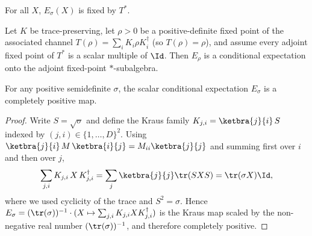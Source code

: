 \begin{lemma}
    \label{lem:scalar_conditional_expectation_mem_adjointFixedPoints}
    \leanok
    For all $X$, $E_\sigma(X)$ is fixed by $T^*$.
\end{lemma}

\begin{theorem}
    \label{thm:scalar_conditional_expectation_isConditionalExpectation}
    \leanok
    Let $K$ be trace-preserving, let $\rho>0$ be a positive-definite fixed
    point of the associated channel $T(\rho)=\sum_i K_i\rho K_i^\dagger$ (so $T(\rho)=\rho$), and
    assume every adjoint fixed point of $T^*$ is a scalar multiple of $\Id$.
    Then $E_\rho$ is a conditional expectation onto the adjoint fixed-point
    $*$-subalgebra.
\end{theorem}

\begin{lemma}
    \label{thm:scalar_conditional_expectation_isCPMap}
    \leanok
    For any positive semidefinite $\sigma$, the scalar conditional
    expectation $E_\sigma$ is a completely positive map.
\end{lemma}
\begin{proof}\leanok
    Write $S=\sqrt{\sigma}$ and define the Kraus family
    $K_{j,i}=\ketbra{j}{i}\,S$ indexed by $(j,i)\in\{1,\ldots,D\}^2$.
    Using $\ketbra{j}{i}\,M\,\ketbra{i}{j} = M_{ii} \ketbra{j}{j}$ and
    summing first over $i$ and then over $j$,
    \[
        \sum_{j,i} K_{j,i}\,X\,K_{j,i}^\dagger
        = \sum_j \ketbra{j}{j} \tr(SXS)
        = \tr(\sigma X) \Id,
    \]
    where we used cyclicity of the trace and $S^2=\sigma$. Hence
    $E_\sigma = (\tr(\sigma))^{-1}\cdot(X\mapsto\sum_{j,i}K_{j,i}XK_{j,i}^\dagger)$
    is the Kraus map scaled by the non-negative real number
    $(\tr(\sigma))^{-1}$, and therefore completely positive.
\end{proof}

